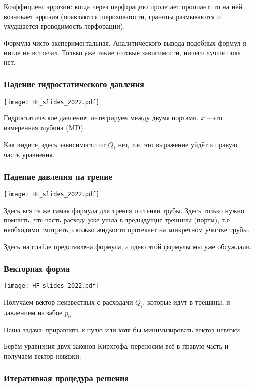 \documentclass[main.tex]{subfiles}
\begin{document}
Коэффициент эррозии: когда через перфорацию пролетает проппант, то на ней возникает эррозия (появляются шероховатости, границы размываются и ухудшается проводимость перфорации).

Формула чисто экспериментальная.
Аналитического вывода подобных формул я нигде не встречал.
Только уже такие готовые зависимости, ничего лучше пока нет.

\subsubsection{Падение гидростатического давления}

\texttt{[image: HF\_slides\_2022.pdf]}

Гидростатическое давление: интегрируем между двумя портами.
$x$ -- это измеренная глубина (MD).

Как видите, здесь зависимости от $Q_i$ нет, т.е. это выражение уйдёт в правую часть уравнения.

\subsubsection{Падение давления на трение}

\texttt{[image: HF\_slides\_2022.pdf]}

Здесь вся та же самая формула для трения о стенки трубы.
Здесь только нужно помнить, что часть расхода уже ушла в предыдущие трещины (порты), т.е. необходимо смотреть, сколько жидкости протекает на конкретном участке трубы.

Здесь на слайде представлена формула, а идею этой формулы мы уже обсуждали.

\subsubsection{Векторная форма}

\texttt{[image: HF\_slides\_2022.pdf]}

Получаем вектор неизвестных с расходами $Q_i$, которые идут в трещины, и давлением на забое $p_0$.

Наша задача: приравнять к нулю или хотя бы минимизировать вектор невязки.

Берём уравнения двух законов Кирхгофа, переносим всё в правую часть и получаем вектор невязки. 

\subsubsection{Итеративная процедура решения}
\end{document}
